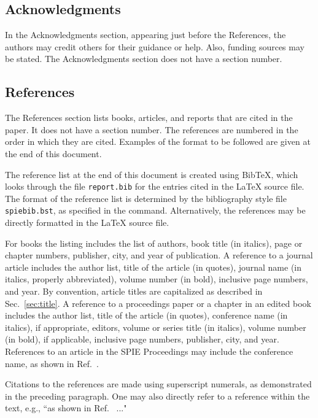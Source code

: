 \documentclass[]{spie}  %
\begin{document}
\subsection{Acknowledgments} 
In the Acknowledgments section, appearing just before the References, the authors may credit others for their guidance or help.  Also, funding sources may be stated.  The Acknowledgments section does not have a section number.

\subsection{References} 
The References section lists books, articles, and reports that are cited in the paper.  It does not have a section number.  The references are numbered in the order in which they are cited.  Examples of the format to be followed are given at the end of this document.  

The reference list at the end of this document is created using BibTeX, which looks through the file {\tt report.bib} for the entries cited in the LaTeX source file.  The format of the reference list is determined by the bibliography style file {\tt spiebib.bst}, as specified in the \verb|| command.  Alternatively, the references may be directly formatted in the LaTeX source file.

For books\cite{Lamport94,Alred03,Goossens97} the listing includes the list of authors, book title (in italics), page or chapter numbers, publisher, city, and year of publication.  A reference to a journal article\cite{Metropolis53} includes the author list, title of the article (in quotes), journal name (in italics, properly abbreviated), volume number (in bold), inclusive page numbers, and year.  By convention\cite{Lamport94}, article titles are capitalized as described in Sec.~\ref{sec:title}.  A reference to a proceedings paper or a chapter in an edited book\cite{Gull89a} includes the author list, title of the article (in quotes), conference name (in italics), if appropriate, editors, volume or series title (in italics), volume number (in bold), if applicable, inclusive page numbers, publisher, city, and year.  References to an article in the SPIE Proceedings may include the conference name, as shown in Ref.~.

Citations to the references are made using superscript numerals, as demonstrated in the preceding paragraph.  One may also directly refer to a reference within the text, e.g., ``as shown in Ref.~ ..." 
\end{document}
